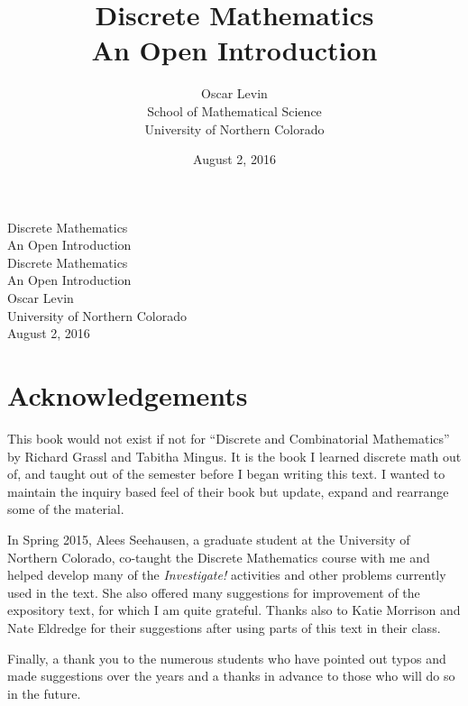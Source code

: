 \documentclass[10pt,]{book}
\title{Discrete Mathematics\\
{\large An Open Introduction}}
\author{Oscar Levin\\
School of Mathematical Science\\
University of Northern Colorado
}
\date{August 2, 2016}
\theoremstyle{plain}
\theoremstyle{definition}
\theoremstyle{definition}
\theoremstyle{definition}
\numberwithin{equation}{section}
\begin{document}
\frontmatter
\thispagestyle{empty}
{\centering
\vspace*{0.28\textheight}
{\Huge Discrete Mathematics}\\[2\baselineskip]
{\LARGE An Open Introduction}\\
}
\clearpage
\thispagestyle{empty}
\null%
\clearpage
\thispagestyle{empty}
{\centering
\vspace*{0.14\textheight}
{\Huge Discrete Mathematics}\\[\baselineskip]
{\LARGE An Open Introduction}\\[3\baselineskip]
{\Large Oscar Levin}\\[0.5\baselineskip]
{\Large University of Northern Colorado}\\[3\baselineskip]
{\Large August 2, 2016}\\}
\clearpage
\thispagestyle{empty}
\null\clearpage
\chapter*{Acknowledgements}\label{acknowledgement-1}

  This book would not exist if not for ``Discrete and Combinatorial Mathematics'' by Richard Grassl and Tabitha Mingus. It is the book I learned discrete math out of, and taught out of the semester before I began writing this text. I wanted to maintain the inquiry based feel of their book but update, expand and rearrange some of the material.
\par

  In Spring 2015, Alees Seehausen, a graduate student at the University of Northern Colorado, co-taught the Discrete Mathematics course with me and helped develop many of the \emph{Investigate!} activities and other problems currently used in the text. She also offered many suggestions for improvement of the expository text, for which I am quite grateful. Thanks also to Katie Morrison and Nate Eldredge for their suggestions after using parts of this text in their class.
\par

  Finally, a thank you to the numerous students who have pointed out typos and made suggestions over the years and a thanks in advance to those who will do so in the future.
\end{document}
